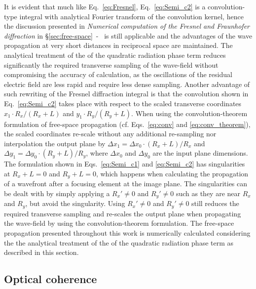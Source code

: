 \begin{refsection}
It is evident that much like Eq.~\ref{eq:Fresnel}, Eq.~\ref{eq:Semi_c2} is a convolution-type integral with analytical Fourier transform of the convolution kernel, hence the discussion presented in \textit{Numerical computation of the Fresnel and Fraunhofer diffraction} in \S\ref{sec:free-space}~-~\textit{} is still applicable and the advantages of the wave propagation at very short distances in reciprocal space are maintained. The analytical treatment of the of the quadratic radiation phase term reduces significantly the required transverse sampling of the wave-field without compromising the accuracy of calculation, as the oscillations of the residual electric field are less rapid and require less dense sampling. Another advantage of such rewriting of the Fresnel diffraction integral is that the convolution shown in Eq.~\ref{eq:Semi_c2} takes place with respect to the scaled transverse coordinates $x_1\cdot R_x/(R_x+L)$ and $y_1\cdot R_y/(R_y+L)$. When using the convolution-theorem formulation of free-space propagation (cf. Eqs.~\ref{eq:conv} and \ref{eq:conv_theorem}), the scaled coordinates re-scale without any additional re-sampling nor interpolation the output plane by $\Delta x_1 = \Delta x_0 \cdot (R_x+L)/R_x$ and  $\Delta y_1 = \Delta y_0 \cdot (R_y+L)/R_y$, where $\Delta x_0$ and $\Delta y_0$ are the input plane dimensions. The formulation shown in Eqs.~\ref{eq:Semi_c1} and \ref{eq:Semi_c2} has singularities at $R_x+L = 0$ and $R_y+L = 0$, which happens when calculating the propagation of a wavefront after a focusing element at the image plane. The singularities can be dealt with by simply applying a $R_x'\neq0$ and $R_y'\neq0$ such as they are near $R_x$ and $R_y$, but avoid the singularity. Using  $R_x'\neq0$ and $R_y'\neq0$ still reduces the required transverse sampling and re-scales the output plane when propagating the wave-field by using the convolution-theorem formulation. The free-space propagation presented throughout this work is numerically calculated considering the the analytical treatment of the of the quadratic radiation phase term as described in this section.
\subsection{Optical coherence}\label{sec:optical_coherence}


\end{refsection}
